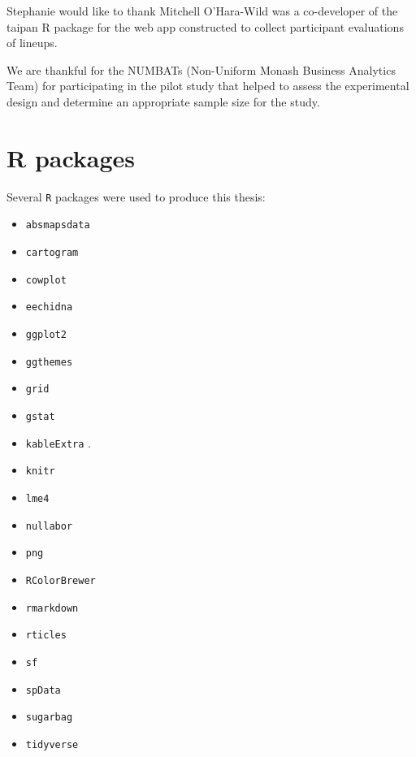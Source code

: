 \documentclass{monashthesis}
\begin{document}
Stephanie would like to thank Mitchell O'Hara-Wild was a co-developer of the taipan \autocite{taipan} R package for the web app constructed to collect participant evaluations of lineups.

We are thankful for the NUMBATs (Non-Uniform Monash Business Analytics Team) for participating in the pilot study that helped to assess the experimental design and determine an appropriate sample size for the study.

\hypertarget{r-packages}{%
\section{R packages}\label{r-packages}}

Several \texttt{R} \autocite{R} packages were used to produce this thesis:

\begin{itemize}
\tightlist
\item
  \texttt{absmapsdata} \autocite{ABSmaps}
\item
  \texttt{cartogram} \autocite{cartogram}
\item
  \texttt{cowplot} \autocite{cowplot}
\item
  \texttt{eechidna} \autocite{eechidna}
\item
  \texttt{ggplot2} \autocite{ggplot2}
\item
  \texttt{ggthemes} \autocite{ggthemes}
\item
  \texttt{grid} \autocite{grid}
\item
  \texttt{gstat} \autocite{gstat}
\item
  \texttt{kableExtra} \autocite{kableExtra}.
\item
  \texttt{knitr} \autocite{knitr}
\item
  \texttt{lme4} \autocite{lme4}
\item
  \texttt{nullabor} \autocite{nullabor}
\item
  \texttt{png} \autocite{png}
\item
  \texttt{RColorBrewer} \autocite{RColorBrewer}
\item
  \texttt{rmarkdown} \autocite{rmarkdown}
\item
  \texttt{rticles} \autocite{rticles}
\item
  \texttt{sf} \autocite{sf}
\item
  \texttt{spData} \autocite{spData}
\item
  \texttt{sugarbag} \autocite{sugarbag}
\item
  \texttt{tidyverse} \autocite{tidyverse}
\end{itemize}
\end{document}
